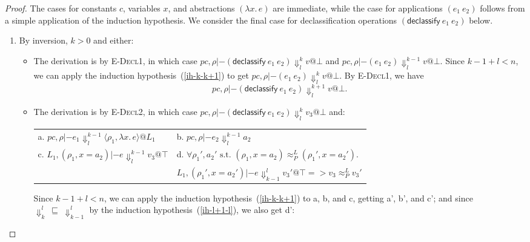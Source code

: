 \documentclass{article}
\makeatletter
\theoremstyle{definition}
\newcommand{\at}{\ensuremath{{\scriptstyle{@}}}}
\newcommand{\pc}{\ensuremath{{\mathit{pc}}}}
\makeatother
\begin{document}
\begin{proof}
  The cases for constants $c$, variables $x$, and abstractions
  $(\lambda{x}.\, e)$ are immediate, while the case for applications
  $(e_1\ e_2)$ follows from a simple application of the induction hypothesis.
  We consider the final case for declassification operations
  $(\mathsf{declassify}\ e_1\ e_2)$ below.
  \begin{enumerate}
  \item By inversion, $k > 0$ and either:
    \begin{itemize}
    \item The derivation is by \textsc{E-Decl1}, in which case
      $\pc, \rho |- (\mathsf{declassify}\ e_1\ e_2)
      \Downarrow^{k}_{l}
      v \at \bot$ and
      $\pc, \rho |- (e_1\ e_2) \Downarrow^{k-1}_{l} v \at \bot$.
      Since $k-1 + l < n$, we can apply the induction
      hypothesis~(\ref{ih-k-k+1})
      to get
      $\pc, \rho |- (e_1\ e_2) \Downarrow^{k}_{l} v \at \bot$.
      By \textsc{E-Decl1}, we have
      \[\pc, \rho |- (\mathsf{declassify}\ e_1\ e_2) \Downarrow^{k+1}_{l}
      v \at \bot.\]
    \item The derivation is by \textsc{E-Decl2}, in which case
      $\pc, \rho |- (\mathsf{declassify}\ e_1\ e_2)
      \Downarrow^{k}_{l}
      v_3 \at \bot$ and:
      \begin{center}
        \begin{tabular*}{1.0\linewidth}{ll}
          a.
          $\pc, \rho |- e_1
          \Downarrow^{k-1}_{l}
          \langle{\rho_1, \lambda{x}.\, e\rangle} \at L_1$
          &
          b.
          $\pc, \rho |- e_2
          \Downarrow^{k-1}_{l}
          a_2$
          \\[1.8ex]
          c.
          $L_1, (\rho_1, x = a_2) |- e
          \Downarrow^{k-1}_{l}
          v_3 \at \top$
          &
          d.
          $\forall{\rho_1', a_2' \text{ s.t. }
            (\rho_1, x = a_2) \approx^{L}_{P} (\rho_1', x = a_2')}.$
          \\
          &
          \quad\quad
          $L_1, (\rho_1', x = a_2') |- e \Downarrow^{l}_{k-1} v_3' \at \top =>
          v_3 \approx^{L}_{P} v_3'$
        \end{tabular*}
      \end{center}
      Since $k-1 + l < n$, we can apply the induction
      hypothesis~(\ref{ih-k-k+1}) to a, b, and c, getting a', b', and c';
      and since $\Downarrow^{l}_{k}\ \sqsubseteq\ \Downarrow^{l}_{k-1}$ by
      the induction hypothesis~(\ref{ih-l+1-l}), we also get d':
      \begin{center}

\end{center}
\end{itemize}
\end{enumerate}
\end{proof}
\end{document}
